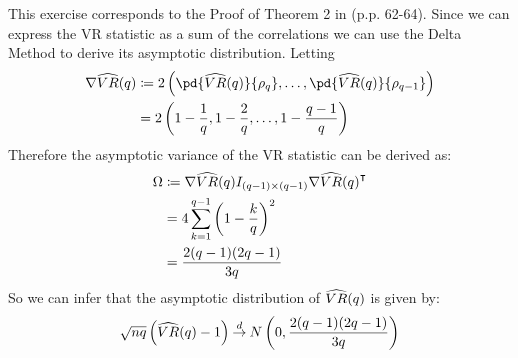 \begin{solution}
    This exercise corresponds to the Proof of Theorem 2 in \citet{lo1988stock} (p.p. 62-64).
    Since we can express the VR statistic as a sum of the correlations we can use the Delta Method to derive its asymptotic distribution. Letting
    \begin{align*}
        \grad \wh{VR}\of{q} & \coloneqq 2 \bp{\pd{\wh{VR}\of{q}}{\rho_q}, \dots, \pd{\wh{VR}\of{q}}{\rho_{q-1}}} \\
        & = 2\bp{1-\frac{1}{q}, 1-\frac{2}{q}, \dots, 1-\frac{q-1}{q}}
    \end{align*}
    Therefore the asymptotic variance of the VR statistic can be derived as:
    \begin{align*}
        \Omega & \coloneqq \nabla\widehat{VR}{\left( q \right)} I_{(q-1)\times (q-1)}\nabla\widehat{VR}{\left( q \right)}^\intercal \\
        & = 4\sum_{k=1}^{q-1} \left( 1-\frac{k}{q} \right)^2 \\
        & = \frac{2(q-1)(2q-1)}{3q}
    \end{align*}
    So we can infer that the asymptotic distribution of \(\widehat{VR}{\left( q \right)}\) is given by:
    \[
        \sqrt{nq}\left( \widehat{VR}(q)-1 \right) \mathbin{\overset{d}{\to}} N\left( 0, \frac{2(q-1)(2q-1)}{3q} \right)
    \]
\end{solution}